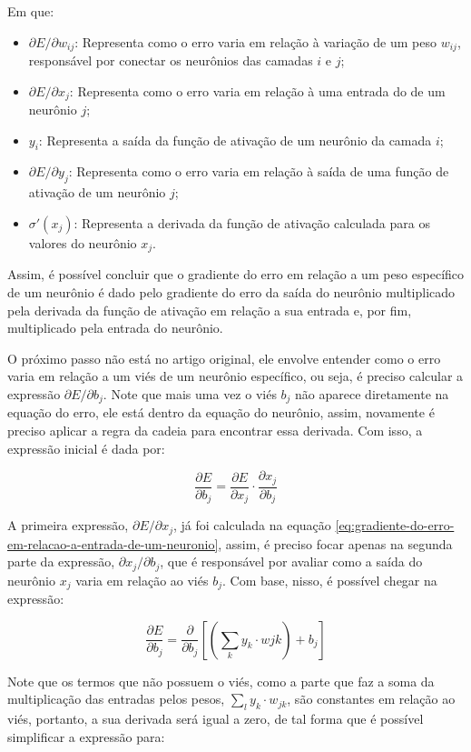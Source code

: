 Em que: 

\begin{itemize}
    \item $\partial E / \partial w_{ij}$: Representa como o erro varia em relação à variação de um peso $w_{ij}$, responsável por conectar os neurônios das camadas $i$ e $j$;
    \item $\partial E / \partial x_j$: Representa como o erro varia em relação à uma entrada do de um neurônio $j$;
    \item $y_i$: Representa a saída da função de ativação de um neurônio da camada $i$;
    \item $\partial E / \partial y_j$: Representa como o erro varia em relação à saída de uma função de ativação de um neurônio $j$;
    \item $\sigma'(x_j)$: Representa a derivada da função de ativação calculada para os valores do neurônio $x_j$.
\end{itemize}

Assim, é possível concluir que o gradiente do erro em relação a um peso específico de um neurônio é dado pelo gradiente do erro da saída do neurônio multiplicado pela derivada da função de ativação em relação a sua entrada e, por fim, multiplicado pela entrada do neurônio.

O próximo passo não está no artigo original, ele envolve entender como o erro varia em relação a um viés de um neurônio específico, ou seja, é preciso calcular a expressão $\partial E / \partial b_j$. Note que mais uma vez o viés $b_j$ não aparece diretamente na equação do erro, ele está dentro da equação do neurônio, assim, novamente é preciso aplicar a regra da cadeia para encontrar essa derivada. Com isso, a expressão inicial é dada por:

\[
    \frac{\partial E}{\partial b_j} = \frac{\partial E}{\partial x_j} \cdot \frac{\partial x_j}{\partial b_j}
\]

A primeira expressão, $\partial E / \partial x_j$, já foi calculada na equação \ref{eq:gradiente-do-erro-em-relacao-a-entrada-de-um-neuronio}, assim, é preciso focar apenas na segunda parte da expressão, $\partial x_j / \partial b_j$, que é responsável por avaliar como a saída do neurônio $x_j$ varia em relação ao viés $b_j$. Com base, nisso, é possível chegar na expressão:

\[
    \frac{\partial E}{\partial b_j} = \frac{\partial}{\partial b_j} \left[ \left( \sum_k y_k \cdot w{jk} \right) + b_j \right]
\]

Note que os termos que não possuem o viés, como a parte que faz a soma da multiplicação das entradas pelos pesos, $\sum_l y_k \cdot w_{jk}$, são constantes em relação ao viés, portanto, a sua derivada será igual a zero, de tal forma que é possível simplificar a expressão para:


